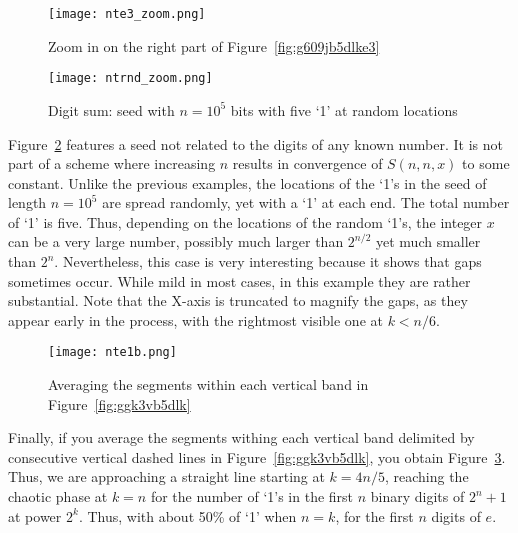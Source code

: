 \documentclass[10pt]{article}
\begin{document}
\begin{figure}[H]
\centering
\texttt{[image: nte3\_zoom.png]}
\caption{Zoom in on the right part of Figure~\ref{fig:g609jb5dlke3}}
\label{fig:g609jb5dlke3z}
\end{figure}


\begin{figure}[H]
\centering
\texttt{[image: ntrnd\_zoom.png]}
\caption{Digit sum: seed with $n=10^5$ bits with five `1' at random locations}
\label{fig:g609jb5dlk}
\end{figure}

Figure~\ref{fig:g609jb5dlk} features a seed not related to the digits of any known number. It is not part of a scheme where increasing $n$ results
 in convergence of $S(n,n,x)$ to some constant. Unlike the previous examples, the locations of the `1's in the seed of length $n=10^5$ are spread randomly, yet with a `1' at each end. The total number of `1' is five. Thus, depending on the locations of the random `1's, the integer $x$ can be a very large number, possibly much larger than $2^{n/2}$ yet much smaller than $2^n$. Nevertheless, this case is very interesting because it shows that gaps sometimes occur. While mild in most cases, in this example they are rather substantial. Note that the X-axis is truncated to magnify the gaps, as they appear early in the process, with the rightmost visible one  at $k < n/6$.

\begin{figure}[H]
\centering
\texttt{[image: nte1b.png]}
\caption{Averaging the segments within each vertical band in Figure~\ref{fig:ggk3vb5dlk}}
\label{fig:g609jb5dlk1b}
\end{figure}

Finally, if you average the segments withing each vertical band delimited by consecutive vertical dashed lines in Figure~\ref{fig:ggk3vb5dlk}, you obtain Figure~\ref{fig:g609jb5dlk1b}. Thus, we are approaching a straight line starting at $k=4n/5$, reaching the chaotic phase at $k=n$ for the number of `1's
 in the first $n$ binary digits of $2^n+1$ at power $2^k$. Thus, with about 50\% of `1' when $n=k$, for the first $n$ digits of $e$. 
\end{document}
